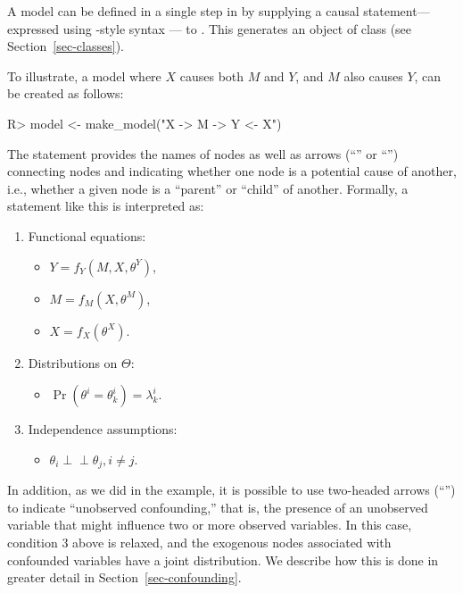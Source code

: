 \documentclass[
  11pt,
  article]{jss}
\providecommand{\tightlist}{%
  \setlength{\itemsep}{0pt}\setlength{\parskip}{0pt}}
\renewcommand{\texttt}[1]{\code{#1}}
\begin{document}
A model can be defined in a single step in  by
supplying a causal statement---expressed using \texttt{dagitty}-style
syntax \citep{textor_robust_2016}--- to \texttt{make\_model}. This
generates an object of class \texttt{causal\_model} (see
Section~\ref{sec-classes}).

To illustrate, a model where \(X\) causes both \(M\) and \(Y\), and
\(M\) also causes \(Y\), can be created as follows:

\begin{CodeInput}
R> model <- make_model("X -> M -> Y <- X")
\end{CodeInput}

The statement provides the names of nodes as well as arrows
(``\texttt{-\textgreater{}}'' or ``\texttt{\textless{}-}'') connecting
nodes and indicating whether one node is a potential cause of another,
i.e., whether a given node is a ``parent'' or ``child'' of another.
Formally, a statement like this is interpreted as:

\begin{enumerate}
\def\labelenumi{\arabic{enumi}.}
\item
  Functional equations:

  \begin{itemize}
  \tightlist
  \item
    \(Y = f_Y(M, X, \theta^Y)\),
  \item
    \(M = f_M(X, \theta^M)\),
  \item
    \(X = f_X(\theta^X)\).
  \end{itemize}
\item
  Distributions on \(\Theta\):

  \begin{itemize}
  \tightlist
  \item
    \(\Pr(\theta^i = \theta^i_k) = \lambda^i_k\).
  \end{itemize}
\item
  Independence assumptions:

  \begin{itemize}
  \tightlist
  \item
    \(\theta_i \perp\!\!\! \perp \theta_j, i\neq j\).
  \end{itemize}
\end{enumerate}

In addition, as we did in the \citet{chickering_clinicians_1996}
example, it is possible to use two-headed arrows
(``\texttt{\textless{}-\textgreater{}}'') to indicate ``unobserved
confounding,'' that is, the presence of an unobserved variable that
might influence two or more observed variables. In this case, condition
3 above is relaxed, and the exogenous nodes associated with confounded
variables have a joint distribution. We describe how this is done in
greater detail in Section~\ref{sec-confounding}.
\end{document}
